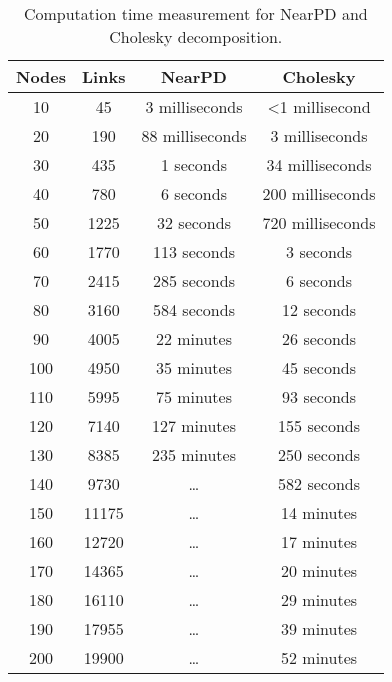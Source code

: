 \begin{table}[H]
    \centering
    \begin{tabular}{|c|c|c|c|}
        \hline
        Nodes & Links & NearPD          & Cholesky                 \\\hline
        10    & 45    & 3 milliseconds  & \textless{}1 millisecond \\\hline
        20    & 190   & 88 milliseconds & 3 milliseconds           \\\hline
        30    & 435   & 1 seconds       & 34 milliseconds          \\\hline
        40    & 780   & 6 seconds       & 200 milliseconds         \\\hline
        50    & 1225  & 32 seconds      & 720 milliseconds         \\\hline
        60    & 1770  & 113 seconds     & 3 seconds                \\\hline
        70    & 2415  & 285 seconds     & 6 seconds                \\\hline
        80    & 3160  & 584 seconds     & 12 seconds               \\\hline
        90    & 4005  & 22 minutes      & 26 seconds               \\\hline
        100   & 4950  & 35 minutes      & 45 seconds               \\\hline
        110   & 5995  & 75 minutes      & 93 seconds               \\\hline
        120   & 7140  & 127 minutes     & 155 seconds              \\\hline
        130   & 8385  & 235 minutes     & 250 seconds              \\\hline
        140   & 9730  & \dots           & 582 seconds              \\\hline
        150   & 11175 & \dots           & 14 minutes               \\\hline
        160   & 12720 & \dots           & 17 minutes               \\\hline
        170   & 14365 & \dots           & 20 minutes               \\\hline
        180   & 16110 & \dots           & 29 minutes               \\\hline
        190   & 17955 & \dots           & 39 minutes               \\\hline
        200   & 19900 & \dots           & 52 minutes               \\\hline
    \end{tabular}
    \caption{Computation time measurement for NearPD and Cholesky decomposition.}
    \label{table:cholesky:spdtime}
\end{table}

